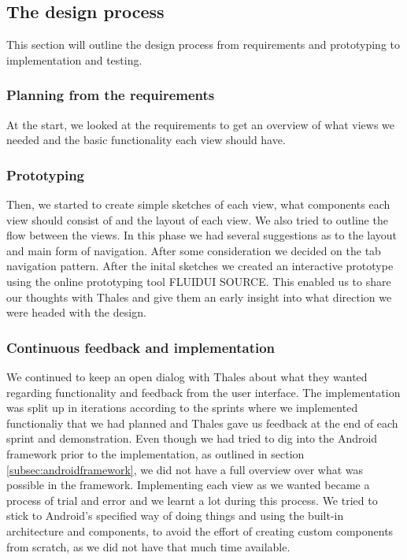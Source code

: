 \subsection{The design process}
This section will outline the design process from requirements and prototyping to implementation and testing.

\subsubsection{Planning from the requirements}
At the start, we looked at the requirements to get an overview of what views we needed and the basic functionality each view should have. 

\pagebreak

\subsubsection{Prototyping}
Then, we started to create simple sketches of each view, what components each view should consist of and the layout of each view. We also tried to outline the flow between the views. In this phase we had several suggestions as to the layout and main form of navigation. After some consideration we decided on the tab navigation pattern.
\newline
\newline
After the inital sketches we created an interactive prototype using the online prototyping tool FLUIDUI SOURCE. This enabled us to share our thoughts with Thales and give them an early insight into what direction we were headed with the design.

\subsubsection{Continuous feedback and implementation}
We continued to keep an open dialog with Thales about what they wanted regarding functionality and feedback from the user interface. The implementation was split up in iterations according to the sprints where we implemented functionaliy that we had planned and Thales gave us feedback at the end of each sprint and demonstration. 
\newline
\newline
Even though we had tried to dig into the Android framework prior to the implementation, as outlined in section \ref{subsec:androidframework}, we did not have a full overview over what was possible in the framework. Implementing each view as we wanted became a process of trial and error and we learnt a lot during this process. We tried to stick to Android's specified way of doing things and using the built-in architecture and components, to avoid the effort of creating custom components from scratch, as we did not have that much time available. 


